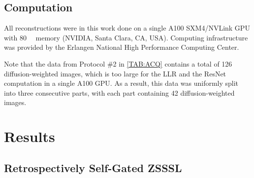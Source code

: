 \documentclass[journal,twoside,web]{ieeecolor}
\newcommand{\argmin}{\operatornamewithlimits{argmin}}
\newcommand{\norm}[1]{\left\lVert#1\right\rVert}
\begin{document}

	\subsection{Computation}

	All reconstructions were in this work done on a single A100 SXM4/NVLink GPU
	with \SI{80}{\giga\byte} memory (NVIDIA, Santa Clara, CA, USA).
	Computing infrastructure was provided by
	the Erlangen National High Performance Computing Center.

	Note that the data from Protocol \#2 in \cref{TAB:ACQ} contains a total of
	126 diffusion-weighted images, which is too large for the LLR and the ResNet computation
	in a single A100 GPU. As a result, this data was uniformly
	split into three consecutive parts,
	with each part containing 42 diffusion-weighted images.

	\section{Results}

	\subsection{Retrospectively Self-Gated ZSSSL}
\end{document}
